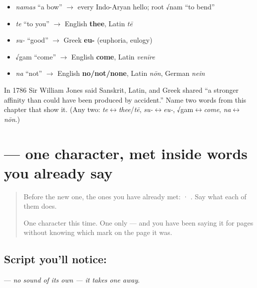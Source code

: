 \begin{grammarlens}[title={What you've built: the roots you now carry}]
\begin{itemize}
\raggedright
  \item \emph{namas} \textquotedblleft{}a bow\textquotedblright{} $\to$ every Indo-Aryan hello; root √nam \textquotedblleft{}to bend\textquotedblright{}
  \item \emph{te} \textquotedblleft{}to you\textquotedblright{} $\to$ English \textbf{thee}, Latin \emph{tē}
  \item \emph{su-} \textquotedblleft{}good\textquotedblright{} $\to$ Greek \textbf{eu-} (euphoria, eulogy)
  \item √gam \textquotedblleft{}come\textquotedblright{} $\to$ English \textbf{come}, Latin \emph{venīre}
  \item \emph{na} \textquotedblleft{}not\textquotedblright{} $\to$ English \textbf{no/not/none}, Latin \emph{nōn}, German \emph{nein}
\end{itemize}
\end{grammarlens}

\begin{tcolorbox}[breakable,colback=teal!4,colframe=teal!35!black,title={Before you move on}]
In 1786 Sir William Jones said Sanskrit, Latin, and Greek shared \textquotedblleft{}a stronger affinity than could have been produced by accident.\textquotedblright{} Name two words from this chapter that show it. (Any two: \emph{te}$\leftrightarrow$\emph{thee}/\emph{tē}, \emph{su-}$\leftrightarrow$\emph{eu-}, √gam$\leftrightarrow$\emph{come}, \emph{na}$\leftrightarrow$\emph{nōn}.)
\end{tcolorbox}
\section[\texorpdfstring{\sk{्} (virāma)}{् (virāma)}]{ — one character, met inside words you already say}

\label{lesson:SA-S05-sign-virama}



\begin{quote}
Before the new one, the ones you have already met:  · . Say what each of them does.

One character this time. One only — and you have been saying it for pages without knowing which mark on the page it was.
\end{quote}

\subsection*{Script you'll notice: }
\textbf{} — \emph{no sound of its own — it takes one away}.

